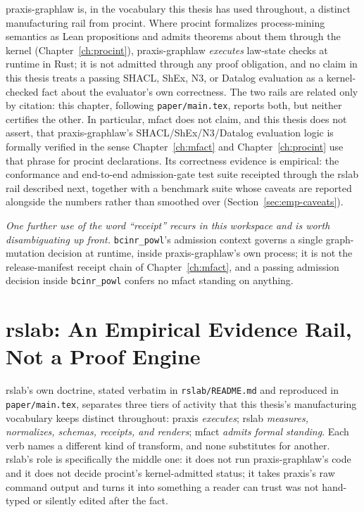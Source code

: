 praxis-graphlaw is, in the vocabulary this thesis has used throughout, a
distinct manufacturing rail from \textsf{procint}. Where \textsf{procint}
formalizes process-mining semantics as Lean propositions and admits
theorems about them through the kernel (Chapter~\ref{ch:procint}),
praxis-graphlaw \emph{executes} law-state checks at runtime in Rust; it
is not admitted through any proof obligation, and no claim in this thesis
treats a passing SHACL, ShEx, N3, or Datalog evaluation as a
kernel-checked fact about the evaluator's own correctness. The two rails
are related only by citation: this chapter, following \texttt{paper/main.tex},
reports both, but neither certifies the other. In particular,
\textsf{mfact} does not claim, and this thesis does not assert, that
praxis-graphlaw's SHACL/ShEx/N3/Datalog evaluation logic is formally
verified in the sense Chapter~\ref{ch:mfact} and Chapter~\ref{ch:procint}
use that phrase for \textsf{procint} declarations. Its correctness
evidence is empirical: the conformance and end-to-end admission-gate test
suite receipted through the rslab rail described next, together with a
benchmark suite whose caveats are reported alongside the numbers rather
than smoothed over (Section~\ref{sec:emp-caveats}).

\emph{One further use of the word ``receipt'' recurs in this workspace and
is worth disambiguating up front.} \texttt{bcinr\_powl}'s admission
context governs a single graph-mutation decision at runtime, inside
praxis-graphlaw's own process; it is not the release-manifest receipt
chain of Chapter~\ref{ch:mfact}, and a passing admission decision inside
\texttt{bcinr\_powl} confers no \textsf{mfact} standing on anything.

\section{rslab: An Empirical Evidence Rail, Not a Proof Engine}
\label{sec:emp-rslab}

rslab's own doctrine, stated verbatim in \texttt{rslab/README.md} and
reproduced in \texttt{paper/main.tex}, separates three tiers of activity
that this thesis's manufacturing vocabulary keeps distinct throughout:
praxis \emph{executes}; rslab \emph{measures, normalizes, schemas,
receipts, and renders}; \textsf{mfact} \emph{admits formal standing}.
Each verb names a different kind of transform, and none substitutes for
another. rslab's role is specifically the middle one: it does not run
praxis-graphlaw's code and it does not decide \textsf{procint}'s
kernel-admitted status; it takes praxis's raw command output and turns it
into something a reader can trust was not hand-typed or silently edited
after the fact.

